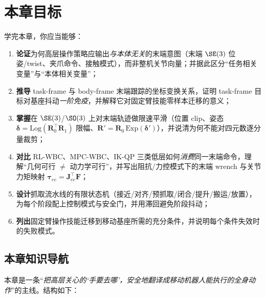 \section*{本章目标}
学完本章，你应当能够：
\begin{enumerate}
  \item \textbf{论证}为何高层操作策略应输出\emph{与本体无关}的末端意图（末端 $\SE(3)$ 位姿/twist、夹爪命令、接触模式），而非整机关节向量；并据此区分“任务相关变量”与“本体相关变量”；
  \item \textbf{推导} task-frame 与 body-frame 末端跟踪的坐标变换关系，证明 task-frame 目标对基座抖动\emph{一阶免疫}，并解释它对固定臂技能零样本迁移的意义；
  \item \textbf{掌握}在 $\SE(3)$/$\SO(3)$ 上对末端轨迹做限速平滑（位置 clip、姿态 $\boldsymbol\delta=\mathrm{Log}(\mathbf R_0^\top\mathbf R_1)$ 限幅、$\mathbf R'=\mathbf R_0\,\mathrm{Exp}(\boldsymbol\delta')$），并说清为何不能对四元数逐分量裁剪；
  \item \textbf{对比} RL-WBC、MPC-WBC、IK-QP 三类低层如何\emph{消费}同一末端命令，理解“几何可行 $\neq$ 动力学可行”，并写出阻抗/力控模式下的末端 wrench 与关节力矩映射 $\boldsymbol\tau_{ee}=\mathbf J_{ee}^\top\mathbf F$；
  \item \textbf{设计}抓取流水线的有限状态机（接近/对齐/预抓取/闭合/提升/搬运/放置），为每个阶段配上控制模式与安全门，并用滞回避免阶段抖动；
  \item \textbf{列出}固定臂操作技能迁移到移动基座所需的充分条件，并说明每个条件失效时的失败模式。
\end{enumerate}

\subsection*{本章知识导航}
本章是一条“\emph{把高层关心的‘手要去哪’，安全地翻译成移动机器人能执行的全身动作}”的主线。结构如下：

